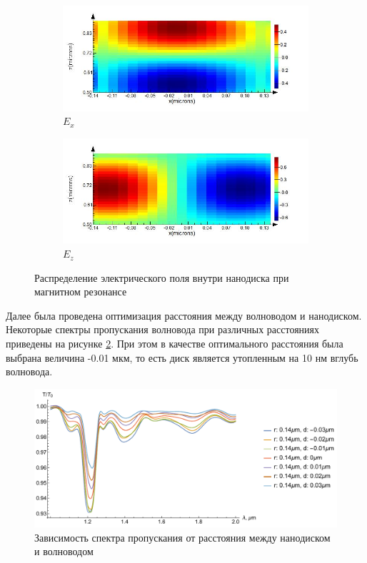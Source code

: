 \begin{figure}[h]
	\begin{subfigure}[b]{.5\textwidth}
		\includegraphics[width=\textwidth]{img/E_x_014}
		\caption{$E_x$}
	\end{subfigure}
	\begin{subfigure}[b]{.5\textwidth}
		\includegraphics[width=\textwidth]{img/E_z_014}
		\caption{$E_z$}
	\end{subfigure}
	\caption{Распределение электрического поля внутри нанодиска при магнитном резонансе}
	\label{fig:E_reson}
\end{figure}

Далее была проведена оптимизация расстояния между волноводом и нанодиском. Некоторые спектры пропускания волновода при различных расстояниях приведены на рисунке \ref{fig:1x_fixed_r}. При этом в качестве оптимального расстояния была выбрана величина -0.01 мкм, то есть диск является утопленным на 10 нм вглубь волновода.

\begin{figure}[h]
	\centering
	\includegraphics[width=.9\textwidth]{img/r_014_d_var}
	\caption{Зависимость спектра пропускания от расстояния между нанодиском и волноводом}
	\label{fig:1x_fixed_r}
\end{figure}

